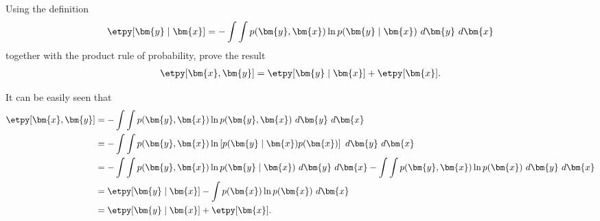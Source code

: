 \begin{question}{1.37}
	Using the definition
	\begin{align*}
		\etpy[\bm{y} \mid \bm{x}] = -\int\int p(\bm{y}, \bm{x}) \ln p(\bm{y} \mid \bm{x})\ d\bm{y}\ d\bm{x}
	\end{align*}
	together with the product rule of probability, prove the result
	\begin{align*}
		\etpy[\bm{x}, \bm{y}] = \etpy[\bm{y} \mid \bm{x}] + \etpy[\bm{x}].
	\end{align*}
\end{question}

\begin{answer}{}
	It can be easily seen that
	\begin{align}
		\etpy[\bm{x}, \bm{y}] &=  -\int\int p(\bm{y}, \bm{x}) \ln p(\bm{y}, \bm{x})\ d\bm{y}\ d\bm{x}\\
		&= -\int\int p(\bm{y}, \bm{x}) \ln \left[p(\bm{y} \mid \bm{x})p(\bm{x})\right]\ d\bm{y}\ d\bm{x}\\
		&= -\int\int p(\bm{y}, \bm{x}) \ln p(\bm{y} \mid \bm{x})\ d\bm{y}\ d\bm{x} -\int\int p(\bm{y}, \bm{x}) \ln p(\bm{x})\ d\bm{y}\ d\bm{x}\\
		&= \etpy[\bm{y} \mid \bm{x}] - \int p(\bm{x}) \ln p(\bm{x})\ d\bm{x}\\
		&= \etpy[\bm{y} \mid \bm{x}] + \etpy[\bm{x}].
	\end{align}
\end{answer}